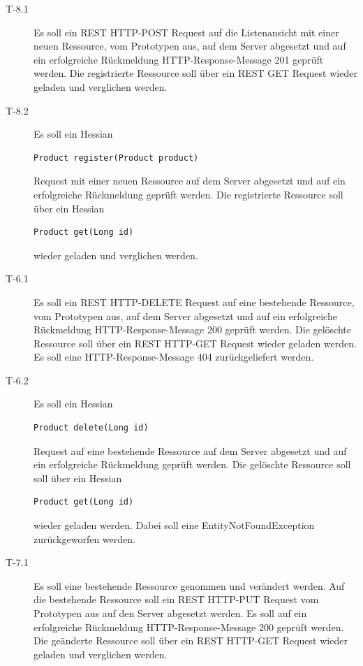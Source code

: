 \documentclass[abstracton, listof=totocnumbered,
bibliography=totocnumbered]{scrreprt}
\begin{document}
\begin{description}
    \item[T-8.1] Es soll ein \ac{REST} HTTP-POST Request auf die
    Listenansicht mit einer neuen Ressource, vom Prototypen aus,
    auf dem Server abgesetzt und auf ein erfolgreiche Rückmeldung
    HTTP-Response-Message 201 geprüft werden. Die registrierte Ressource soll
    über ein \ac{REST} GET Request wieder geladen und verglichen werden.
    \newline

    \item[T-8.2] Es soll ein Hessian 
    \begin{verbatim}Product register(Product product)\end{verbatim}
    Request mit einer neuen Ressource auf dem Server abgesetzt und auf ein
    erfolgreiche Rückmeldung geprüft werden. Die registrierte Ressource soll
    über ein Hessian \begin{verbatim}Product get(Long id)\end{verbatim} wieder
    geladen und verglichen werden.
    \newline
    
    \item[T-6.1] Es soll ein \ac{REST} HTTP-DELETE Request auf
    eine bestehende Ressource, vom Prototypen aus, auf dem Server abgesetzt und
    auf ein erfolgreiche Rückmeldung HTTP-Response-Message 200 geprüft werden.
    Die gelöschte Ressource soll über ein \ac{REST} HTTP-GET Request wieder
    geladen werden. Es soll eine HTTP-Response-Message 404 zurückgeliefert werden.
    \newline

    \item[T-6.2] Es soll ein Hessian 
    \begin{verbatim}Product delete(Long id)\end{verbatim}
    Request auf eine bestehende Ressource auf dem Server abgesetzt und auf ein
    erfolgreiche Rückmeldung geprüft werden. Die gelöschte Ressource
    soll soll über ein Hessian 
    \begin{verbatim}Product get(Long id)\end{verbatim} 
    wieder geladen werden. Dabei soll eine EntityNotFoundException
    zurückgeworfen werden.
    \newline
    
    \item[T-7.1] Es soll eine bestehende Ressource genommen und
    verändert werden. Auf die bestehende Ressource soll ein \ac{REST} HTTP-PUT
    Request vom Prototypen aus auf den Server abgesetzt werden. Es soll auf
    ein erfolgreiche Rückmeldung HTTP-Response-Message 200 geprüft werden. Die
    geänderte Ressource soll über ein \ac{REST} HTTP-GET Request wieder geladen
    und verglichen werden.
    \newpage
        

\end{description}
\end{document}

